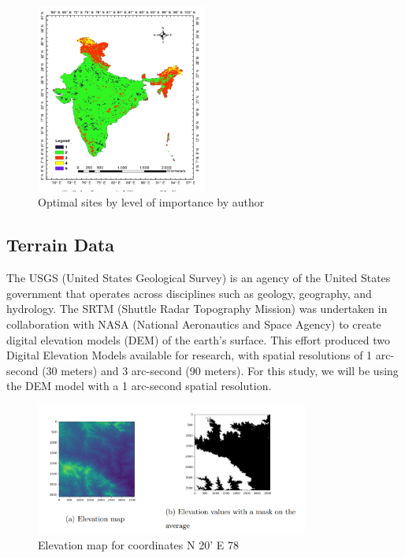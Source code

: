 \documentclass[a4paper,12pt]{Classes/RoboticsLaTeX}
\begin{document}
	\begin{figure}[H]
		\centering
		\includegraphics[width=0.5\textwidth]{Figures/Saraswat.png} %
		\caption{ Optimal sites by level of importance by author \cite{saraswat2021}}
		\label{fig:my_label} %
	\end{figure}
	

	\subsection{Terrain Data}

	The USGS (United States Geological Survey) is an agency of the United States government that operates across disciplines such as geology, geography, and hydrology. 
	The SRTM (Shuttle Radar Topography Mission) was undertaken in collaboration with NASA (National Aeronautics and Space Agency) to create digital elevation models (DEM) 
	of the earth's surface. This effort produced two Digital Elevation Models available for research, with spatial resolutions of 1 arc-second (30 meters) and 3 arc-second 
	(90 meters). For this study, we will be using the DEM model with a 1 arc-second spatial resolution\cite{farr2000}.

	\begin{figure}[H]
		\centering
		\includegraphics[width=0.8\textwidth]{Figures/Terrain.png} %
		\caption{Elevation map for coordinates N 20' E 78}
		\label{fig:my_label2} %
	\end{figure}
\end{document}
